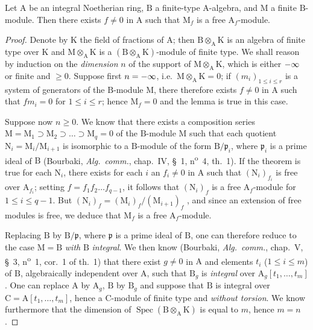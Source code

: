 \begin{lemma}[6.9.2]
\label{IV.6.9.2}
Let $\mathrm{A}$ be an integral Noetherian ring, $\mathrm{B}$ a finite-type $\mathrm{A}$-algebra, and $\mathrm{M}$ a finite $\mathrm{B}$-module. Then there exists $f\neq 0$ in $\mathrm{A}$ such that $\mathrm{M}_f$ is a free $\mathrm{A}_f$-module.
\end{lemma}

\begin{proof}
Denote by $\mathrm{K}$ the field of fractions of $\mathrm{A}$; then $\mathrm{B}\otimes_\mathrm{A}\mathrm{K}$ is an algebra of finite type over $\mathrm{K}$ and $\mathrm{M}\otimes_\mathrm{A}\mathrm{K}$ is a $(\mathrm{B}\otimes_\mathrm{A}\mathrm{K})$-module of finite type. We shall reason by induction on the \emph{dimension} $n$ of the support of $\mathrm{M}\otimes_\mathrm{A}\mathrm{K}$, which is either $-\infty$ or finite and $\geqslant 0$. Suppose first $n=-\infty$, i.e.\ $\mathrm{M}\otimes_\mathrm{A}\mathrm{K}=0$; if $(m_i)_{1\leqslant i\leqslant r}$ is a system of generators of the $\mathrm{B}$-module $\mathrm{M}$, there therefore exists $f\neq 0$ in $\mathrm{A}$ such that $fm_i=0$ for $1\leqslant i\leqslant r$; hence $\mathrm{M}_f=0$ and the lemma is true in this case.

Suppose now $n\geqslant 0$. We know that there exists a composition series $\mathrm{M}=\mathrm{M}_1\supset\mathrm{M}_2\supset\ldots\supset\mathrm{M}_q=0$ of the $\mathrm{B}$-module $\mathrm{M}$ such that each quotient $\mathrm{N}_i=\mathrm{M}_i/\mathrm{M}_{i+1}$ is isomorphic to a $\mathrm{B}$-module of the form $\mathrm{B}/\mathfrak{p}_i$, where $\mathfrak{p}_i$ is a prime ideal of $\mathrm{B}$ (Bourbaki, \emph{Alg.\ comm.}, chap.~IV, \S~1, n\textsuperscript{o}~4, th.~1). If the theorem is true for each $\mathrm{N}_i$, there exists for each $i$ an $f_i\neq 0$ in $\mathrm{A}$ such that $(\mathrm{N}_i)_{f_i}$ is free over $\mathrm{A}_{f_i}$; setting $f=f_1f_2\ldots f_{q-1}$, it follows that $(\mathrm{N}_i)_f$ is a free $\mathrm{A}_f$-module for $1\leqslant i\leqslant q-1$. But $(\mathrm{N}_i)_f=(\mathrm{M}_i)_f/(\mathrm{M}_{i+1})_f$ , and since an extension of free modules is free, we deduce that $\mathrm{M}_f$ is a free $\mathrm{A}_f$-module.

Replacing $\mathrm{B}$ by $\mathrm{B}/\mathfrak{p}$, where $\mathfrak{p}$ is a prime ideal of $\mathrm{B}$, one can therefore reduce to the case $\mathrm{M}=\mathrm{B}$ \emph{with} $\mathrm{B}$ \emph{integral}. We then know (Bourbaki, \emph{Alg.\ comm.}, chap.~V, \S~3, n\textsuperscript{o}~1, cor.~1 of th.~1) that there exist $g\neq 0$ in $\mathrm{A}$ and elements $t_i$ ($1\leqslant i\leqslant m$) of $\mathrm{B}$, algebraically independent over $\mathrm{A}$, such that $\mathrm{B}_g$ is \emph{integral} over $\mathrm{A}_g[t_1,\ldots,t_m]$. One can replace $\mathrm{A}$ by $\mathrm{A}_g$, $\mathrm{B}$ by $\mathrm{B}_g$ and suppose that $\mathrm{B}$ is integral over $\mathrm{C}=\mathrm{A}[t_1,\ldots,t_m]$, hence a $\mathrm{C}$-module of finite type and \emph{without torsion}. We know furthermore  that the dimension of $\operatorname{Spec}(\mathrm{B}\otimes_\mathrm{A}\mathrm{K})$ is equal to $m$, hence $m=n$.


\end{proof}
